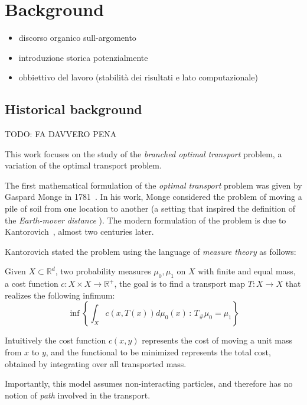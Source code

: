 \documentclass[12pt,a4paper]{article}
\numberwithin{equation}{section}
\theoremstyle{mytheorem}
\theoremstyle{myremark}
\theoremstyle{myparagraph}
\newcommand{\R}{\mathbb{R}}
\begin{document}
    \section{Background}
    \begin{itemize}
        \item discorso organico sull-argomento
        \item introduzione storica potenzialmente
        \item obbiettivo del lavoro (stabilità dei risultati e lato computazionale)
    \end{itemize}

    \subsection{Historical background}
    
    TODO: FA DAVVERO PENA

    This work focuses on the study of the \textit{branched optimal transport} problem, a variation of the optimal transport problem.

    The first mathematical formulation of the \textit{optimal transport} problem was given by Gaspard Monge in 1781~\cite{monge1781mémoire}.
    In his work, Monge considered the problem of moving a pile of soil from one location to another (a setting that inspired the definition of the \textit{Earth-mover distance} \cite{EDM}).
    The modern formulation of the problem is due to Kantorovich~\cite{Kantorovich1958}, almost two centuries later.

    Kantorovich stated the problem using the language of \textit{measure theory} as follows:

    Given $X \subset \R^d$, two probability measures $\mu_0, \mu_1$ on $X$ with finite and equal mass, a cost function $c: X \times X \to \R^+$, the goal is to find a transport map
     $T: X \to X$ that realizes the following infimum:
    \begin{equation}
        \inf \left\{ \int_X c(x, T(x)) d\mu_0(x) \, : \, T_\# \mu_0 = \mu_1 \right\}
        \label{eq:monge}
    \end{equation}

    Intuitively the cost function $c(x,y)$ represents the cost of moving a unit mass from $x$ to $y$, 
    and the functional to be minimized represents the total cost, obtained by integrating over all transported mass.
    
    Importantly, this model assumes non-interacting particles, and therefore has no notion of \textit{path} involved in the transport.
    
\end{document}
